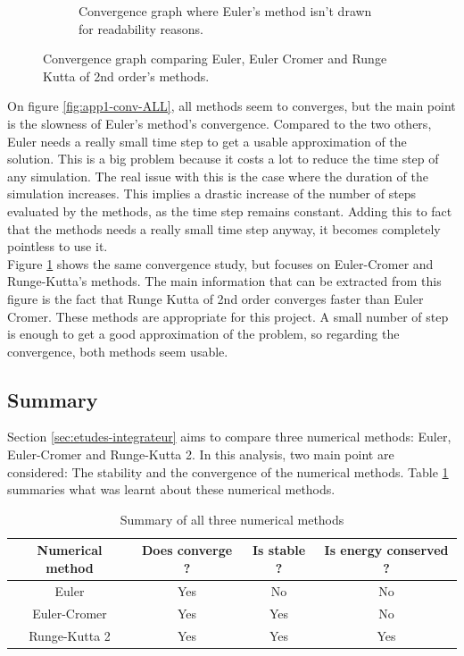 \documentclass[a4paper,12pt,twoside]{article}
\begin{document}
\begin{figure}[h]
\begin{subfigure}[t]{0.45\textwidth}
	\caption{Convergence graph where Euler's method isn't drawn for readability reasons.}
	\label{fig:app1-conv-noEuler}
\end{subfigure}
\caption{Convergence graph comparing Euler, Euler Cromer and Runge Kutta of 2nd order's methods.}
\label{fig:app1-conv}
\end{figure}

On figure \ref{fig:app1-conv-ALL}, all methods seem to converges, but the main point is the slowness of Euler's method's convergence.
Compared to the two others, Euler needs a really small time step to get a usable approximation of the solution.
This is a big problem because it costs a lot to reduce the time step of any simulation.
The real issue with this is the case where the duration of the simulation increases. 
This implies a drastic increase of the number of steps evaluated by the methods, as the time step remains constant.
Adding this to fact that the methods needs a really small time step anyway, it becomes completely pointless to use it.\\

Figure \ref{fig:app1-conv-noEuler} shows the same convergence study, but focuses on Euler-Cromer and Runge-Kutta's methods.
The main information that can be extracted from this figure is the fact that Runge Kutta of 2nd order converges faster than Euler Cromer.
These methods are appropriate for this project.
A small number of step is enough to get a good approximation of the problem, so regarding the convergence, both methods seem usable. %


\subsection{Summary}
Section \ref{sec:etudes-integrateur} aims to compare three numerical methods: Euler, Euler-Cromer and Runge-Kutta 2.
In this analysis, two main point are considered: The stability and the convergence of the numerical methods.
Table \ref{tab:comparaison-integrateur} summaries what was learnt about these numerical methods.

\begin{table}[h]
\centering
\begin{tabular}{c | c | c | c}
	Numerical method & Does converge ? & Is stable ? & Is energy conserved ? \\
	\hline
	Euler & Yes & No & No\\
	Euler-Cromer & Yes & Yes & No \\
	Runge-Kutta 2 & Yes & Yes & Yes\\
\end{tabular}
\caption{Summary of all three numerical methods}
\label{tab:comparaison-integrateur}
\end{table}
\end{document}
